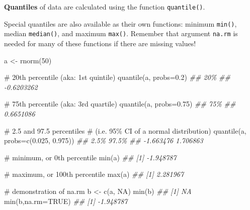 \documentclass[
  13,
  letterpaper,
]{report}
\newenvironment{Shaded}{\begin{snugshade}}{\end{snugshade}}
\newcommand{\AttributeTok}[1]{\textcolor[rgb]{0.40,0.45,0.13}{#1}}
\newcommand{\CommentTok}[1]{\textcolor[rgb]{0.37,0.37,0.37}{#1}}
\newcommand{\ConstantTok}[1]{\textcolor[rgb]{0.56,0.35,0.01}{#1}}
\newcommand{\DecValTok}[1]{\textcolor[rgb]{0.68,0.00,0.00}{#1}}
\newcommand{\DocumentationTok}[1]{\textcolor[rgb]{0.37,0.37,0.37}{\textit{#1}}}
\newcommand{\FloatTok}[1]{\textcolor[rgb]{0.68,0.00,0.00}{#1}}
\newcommand{\FunctionTok}[1]{\textcolor[rgb]{0.28,0.35,0.67}{#1}}
\newcommand{\NormalTok}[1]{\textcolor[rgb]{0.00,0.23,0.31}{#1}}
\newcommand{\OtherTok}[1]{\textcolor[rgb]{0.00,0.23,0.31}{#1}}
\newcommand{\SpecialCharTok}[1]{\textcolor[rgb]{0.37,0.37,0.37}{#1}}
\begin{document}
\begin{Shaded}
\end{Shaded}

\textbf{Quantiles} of data are calculated using the function
\texttt{quantile()}.

Special quantiles are also available as their own functions: minimum
\texttt{min()}, median \texttt{median()}, and maximum \texttt{max()}.
Remember that argument \texttt{na.rm} is needed for many of these
functions if there are missing values!

\begin{Shaded}
\begin{Highlighting}[]

\NormalTok{a }\OtherTok{\textless{}{-}} \FunctionTok{rnorm}\NormalTok{(}\DecValTok{50}\NormalTok{)}

\CommentTok{\# 20th percentile (aka: 1st quintile)}
\FunctionTok{quantile}\NormalTok{(a, }\AttributeTok{probs=}\FloatTok{0.2}\NormalTok{) }
\DocumentationTok{\#\#        20\% }
\DocumentationTok{\#\# {-}0.6203262}

\CommentTok{\# 75th percentile (aka: 3rd quartile)}
\FunctionTok{quantile}\NormalTok{(a, }\AttributeTok{probs=}\FloatTok{0.75}\NormalTok{) }
\DocumentationTok{\#\#       75\% }
\DocumentationTok{\#\# 0.6651086}

\CommentTok{\# 2.5 and 97.5 percentiles}
\CommentTok{\# (i.e. 95\% CI of a normal distribution)}
\FunctionTok{quantile}\NormalTok{(a, }\AttributeTok{probs=}\FunctionTok{c}\NormalTok{(}\FloatTok{0.025}\NormalTok{, }\FloatTok{0.975}\NormalTok{)) }
\DocumentationTok{\#\#      2.5\%     97.5\% }
\DocumentationTok{\#\# {-}1.663476  1.706863}

\CommentTok{\# minimum, or 0th percentile}
\FunctionTok{min}\NormalTok{(a) }
\DocumentationTok{\#\# [1] {-}1.948787}

\CommentTok{\# maximum, or 100th percentile}
\FunctionTok{max}\NormalTok{(a)}
\DocumentationTok{\#\# [1] 2.281967}

\CommentTok{\# demonstration of na.rm}
\NormalTok{b }\OtherTok{\textless{}{-}} \FunctionTok{c}\NormalTok{(a, }\ConstantTok{NA}\NormalTok{)}
\FunctionTok{min}\NormalTok{(b)}
\DocumentationTok{\#\# [1] NA}
\FunctionTok{min}\NormalTok{(b,}\AttributeTok{na.rm=}\ConstantTok{TRUE}\NormalTok{)}
\DocumentationTok{\#\# [1] {-}1.948787}
\end{Highlighting}
\end{Shaded}
\end{document}
